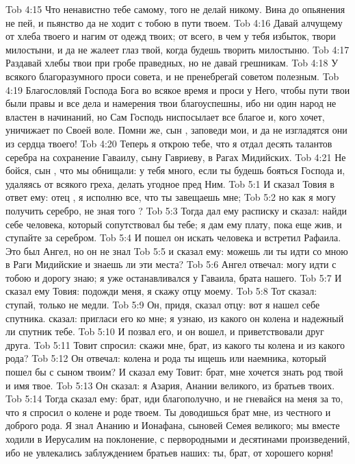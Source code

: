 \vs Tob 4:15 Что ненавистно тебе самому, того не делай никому. Вина до опьянения не пей, и пьянство да не ходит с тобою в пути твоем.
\vs Tob 4:16 Давай алчущему от хлеба твоего и нагим от одежд твоих; от всего, в чем у тебя избыток, твори милостыни, и да не жалеет глаз твой, когда будешь творить милостыню.
\vs Tob 4:17 Раздавай хлебы твои при гробе праведных, но не давай грешникам.
\vs Tob 4:18 У всякого благоразумного проси совета, и не пренебрегай советом полезным.
\vs Tob 4:19 Благословляй Господа Бога во всякое время и проси у Него, чтобы пути твои были правы и все дела и намерения твои благоуспешны, ибо ни один народ не властен в  начинаний, но Сам Господь ниспосылает все благое и, кого хочет, уничижает по Своей воле. Помни же, сын , заповеди мои, и да не изгладятся они из сердца твоего!
\vs Tob 4:20 Теперь я открою тебе, что я отдал десять талантов серебра на сохранение Гаваилу, сыну Гавриеву, в Рагах Мидийских.
\vs Tob 4:21 Не бойся, сын , что мы обнищали: у тебя много, если ты будешь бояться Господа и, удаляясь от всякого греха, делать угодное пред Ним.
\vs Tob 5:1 И сказал Товия в ответ ему: отец , я исполню все, что ты завещаешь мне;
\vs Tob 5:2 но как я могу получить серебро, не зная того ?
\vs Tob 5:3 Тогда  дал ему расписку и сказал: найди себе человека, который сопутствовал бы тебе; я дам ему плату, пока еще жив, и ступайте за серебром.
\rsbpar\vs Tob 5:4 И пошел он искать человека и встретил Рафаила. Это был Ангел, но он не знал
\vs Tob 5:5 и сказал ему: можешь ли ты идти со мною в Раги Мидийские и знаешь ли эти места?
\vs Tob 5:6 Ангел отвечал: могу идти с тобою и дорогу знаю; я уже останавливался у Гаваила, брата нашего.
\vs Tob 5:7 И сказал ему Товия: подожди меня, я скажу отцу моему.
\vs Tob 5:8 Тот сказал: ступай, только не медли.
\vs Tob 5:9 Он, придя, сказал отцу: вот я нашел себе спутника.  сказал: пригласи его ко мне; я узнаю, из какого он колена и надежный ли спутник тебе.
\vs Tob 5:10 И позвал его, и он вошел, и приветствовали друг друга.
\vs Tob 5:11 Товит спросил: скажи мне, брат, из какого ты колена и из какого рода?
\vs Tob 5:12 Он отвечал: колена и рода ты ищешь или наемника, который пошел бы с сыном твоим? И сказал ему Товит: брат, мне хочется знать род твой и имя твое.
\vs Tob 5:13 Он сказал: я Азария,  Анании великого, из братьев твоих.
\vs Tob 5:14 Тогда  сказал ему: брат, иди благополучно, и не гневайся на меня за то, что я спросил о колене и роде твоем. Ты доводишься брат мне, из честного и доброго рода. Я знал Ананию и Ионафана, сыновей Семея великого; мы вместе ходили в Иерусалим на поклонение, с первородными и десятинами  произведений, ибо не увлекались заблуждением братьев наших: ты, брат, от хорошего корня!
